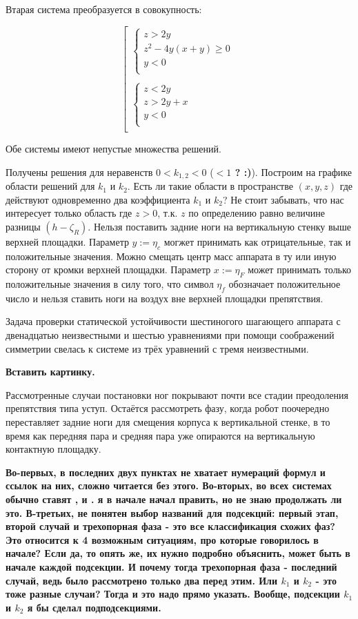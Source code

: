 Втарая система преобразуется в совокупность:

$$
\left[
\begin{array}{l}
    \left\{
        \begin{array}{l}
         z>2y\\
         z^2-4y(x+y)\geq 0\\
         y<0\\
        \end{array}
    \right.\\
    \\
    \left\{
        \begin{array}{l}
         z<2y\\
         z>2y+x\\
         y<0\\
        \end{array}
    \right.\\
\end{array}
\right.
$$

Обе системы имеют непустые множества решений.

Получены решения для неравенств $0<k_{1,2}<0$ (\textbf{$<1$ ? :)}). Построим на графике области решений для $k_1$ и $k_2$.
Есть ли такие области в пространстве $(x,y,z)$ где действуют одновременно два коэффициента $k_1$ и $k_2$? Не стоит забывать, что нас интересует только область где $z>0$, т.к. $z$ по определению равно величине разницы $(h-\zeta_R)$. Нельзя поставить задние ноги на вертикальную стенку выше верхней площадки. Параметр $y:=\eta_c$ могжет принимать как отрицательные, так и положительные значения. Можно смещать центр масс аппарата в ту или иную сторону от кромки верхней площадки. Параметр $x:=\eta_F$ может принимать только положительные значения в силу того, что символ $\eta_f$ обозначает положительное число и нельзя ставить ноги на воздух вне верхней площадки препятствия.

Задача проверки статической устойчивости шестиногого шагающего аппарата с двенадцатью неизвестными и шестью уравнениями при помощи соображений симметрии свелась к системе из трёх уравнений с тремя неизвестными.

\textbf{Вставить картинку.}


Рассмотренные случаи постановки ног покрывают почти все стадии преодоления препятствия типа уступ. Остаётся рассмотреть фазу, когда робот поочередно переставляет задние ноги для смещения корпуса к вертикальной стенке, в то время как передняя пара и средняя пара уже опираются на вертикальную контактную площадку.

\textbf{Во-первых, в последних двух пунктах не хватает нумераций формул и ссылок на них, сложно читается без этого.
Во-вторых, во всех системах обычно ставят , и . я в начале начал править, но не знаю продолжать ли это. 
В-третьих, не понятен выбор названий для подсекций: первый этап, второй случай и трехопорная фаза - это все классификация схожих фаз? Это относится к 4 возможным ситуациям, про которые говорилось в начале? Если да, то опять же, их нужно подробно объяснить, может быть в начале каждой подсекции. И почему тогда трехопорная фаза - последний случай, ведь было рассмотрено только два перед этим. Или $k_1$ и $k_2$ - это тоже разные случаи? Тогда и это надо прямо указать. Вообще, подсекции $k_1$ и $k_2$ я бы сделал подподсекциями.}